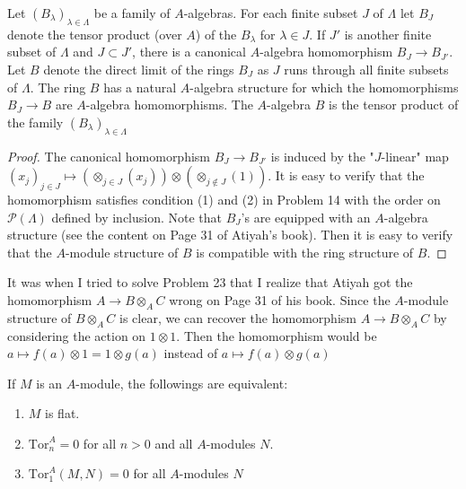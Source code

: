 \documentclass{solution}
\begin{document}
\begin{problem}
    Let $(B_\lambda)_{\lambda \in \Lambda}$ be a family of $A$-algebras. For each finite subset $J$ of $\Lambda$ let $B_J$ denote the tensor product (over $A$) of the $B_\lambda$ for $\lambda \in J$. If $J'$ is another finite subset of $\Lambda$ and $J \subset J'$, there is a canonical $A$-algebra homomorphism $B_J \rightarrow B_{J'}$. Let $B$ denote the direct limit of the rings $B_J$ as $J$ runs through all finite subsets of $\Lambda$. The ring $B$ has a natural $A$-algebra structure for which the homomorphisms $B_J \rightarrow B$ are $A$-algebra homomorphisms. The $A$-algebra $B$ is the tensor product of the family $(B_\lambda)_{\lambda \in \Lambda}$
\end{problem}

\begin{proof}
    The canonical homomorphism $B_J \rightarrow B_{J'}$ is induced by the "$J$-linear" map $(x_j)_{j \in J} \mapsto \left(\otimes_{j \in J} (x_j)\right) \otimes \left(\otimes_{j \notin J} (1)\right)$. It is easy to verify that the homomorphism satisfies condition (1) and (2) in Problem 14 with the order on $\mathcal{P}(\Lambda)$ defined by inclusion. Note that $B_J$'s are equipped with an $A$-algebra structure (see the content on Page 31 of Atiyah's book). Then it is easy to verify that the $A$-module structure of $B$ is compatible with the ring structure of $B$.
\end{proof}

{\color{red} It was when I tried to solve Problem 23 that I realize that Atiyah got the homomorphism $A \rightarrow B \otimes_A C$ wrong on Page 31 of his book. Since the $A$-module structure of $B \otimes_A C$ is clear, we can recover the homomorphism $A \rightarrow B \otimes_A C$ by considering the action on $1 \otimes 1$. Then the homomorphism would be $a \mapsto f(a) \otimes 1 = 1 \otimes g(a)$ instead of $a \mapsto f(a) \otimes g(a)$}

\begin{problem}
    If $M$ is an $A$-module, the followings are equivalent:
    \begin{enumerate}
        \item $M$ is flat.
        \item $\mathrm{Tor}_{n}^{A} = 0$ for all $n \gt 0$ and all $A$-modules $N$.
        \item $\mathrm{Tor}_{1}^{A}(M, N) = 0$ for all $A$-modules $N$
    \end{enumerate}
\end{problem}
\end{document}
